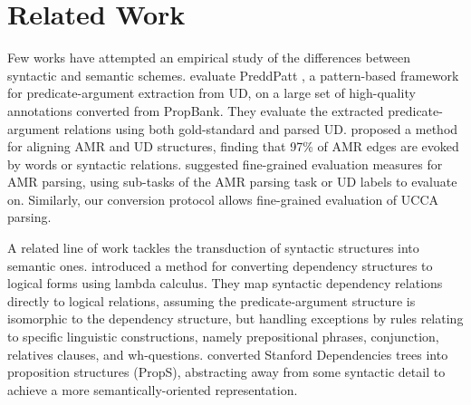 \documentclass[11pt,a4paper]{article}
\begin{document}
\section{Related Work}\label{sec:related_work}

Few works have attempted an empirical study of the differences between syntactic and semantic 
schemes. 
 evaluate PreddPatt \citep{white2016universal},
a pattern-based framework for predicate-argument extraction from UD,
on a large set of high-quality annotations converted from PropBank.
They evaluate the extracted predicate-argument relations using both
gold-standard and parsed UD.
 proposed a method for aligning AMR and UD structures,
finding that 97\% of AMR edges are evoked by words or syntactic relations.
 suggested fine-grained evaluation measures
for AMR parsing, using sub-tasks of the AMR parsing task or UD labels to evaluate on.
Similarly, our conversion protocol allows fine-grained evaluation of UCCA parsing.

A related line of work tackles the transduction of syntactic structures into semantic ones.
 introduced a method for converting dependency
structures to logical forms using lambda calculus.
They map syntactic dependency relations directly to logical relations,
assuming the predicate-argument structure is isomorphic to the dependency structure,
but handling exceptions by rules relating to specific linguistic constructions,
namely prepositional phrases, conjunction, relatives clauses, and wh-questions.
 converted Stanford Dependencies trees into
proposition structures ({\sc PropS}), abstracting away from some syntactic detail to
achieve a more semantically-oriented representation.

%
\end{document}
